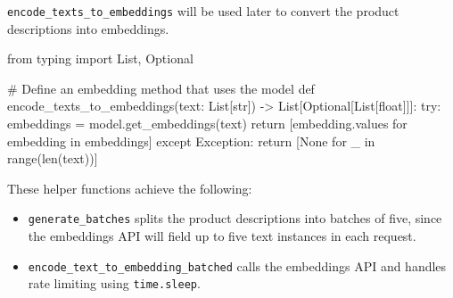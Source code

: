 \documentclass[
  letterpaper,
  DIV=11,
  numbers=noendperiod]{scrreprt}
\newenvironment{Shaded}{\begin{snugshade}}{\end{snugshade}}
\newcommand{\BuiltInTok}[1]{\textcolor[rgb]{0.00,0.23,0.31}{#1}}
\newcommand{\CommentTok}[1]{\textcolor[rgb]{0.37,0.37,0.37}{#1}}
\newcommand{\ControlFlowTok}[1]{\textcolor[rgb]{0.00,0.23,0.31}{#1}}
\newcommand{\ImportTok}[1]{\textcolor[rgb]{0.00,0.46,0.62}{#1}}
\newcommand{\KeywordTok}[1]{\textcolor[rgb]{0.00,0.23,0.31}{#1}}
\newcommand{\NormalTok}[1]{\textcolor[rgb]{0.00,0.23,0.31}{#1}}
\newcommand{\OperatorTok}[1]{\textcolor[rgb]{0.37,0.37,0.37}{#1}}
\newcommand{\PreprocessorTok}[1]{\textcolor[rgb]{0.68,0.00,0.00}{#1}}
\newcommand{\VariableTok}[1]{\textcolor[rgb]{0.07,0.07,0.07}{#1}}
\begin{document}
\texttt{encode\_texts\_to\_embeddings} will be used later to convert the
product descriptions into embeddings.

\begin{Shaded}
\begin{Highlighting}[]
\ImportTok{from}\NormalTok{ typing }\ImportTok{import}\NormalTok{ List, Optional}

\CommentTok{\# Define an embedding method that uses the model}
\KeywordTok{def}\NormalTok{ encode\_texts\_to\_embeddings(text: List[}\BuiltInTok{str}\NormalTok{]) }\OperatorTok{{-}\textgreater{}}\NormalTok{ List[Optional[List[}\BuiltInTok{float}\NormalTok{]]]:}
    \ControlFlowTok{try}\NormalTok{:}
\NormalTok{        embeddings }\OperatorTok{=}\NormalTok{ model.get\_embeddings(text)}
        \ControlFlowTok{return}\NormalTok{ [embedding.values }\ControlFlowTok{for}\NormalTok{ embedding }\KeywordTok{in}\NormalTok{ embeddings]}
    \ControlFlowTok{except} \PreprocessorTok{Exception}\NormalTok{:}
        \ControlFlowTok{return}\NormalTok{ [}\VariableTok{None} \ControlFlowTok{for}\NormalTok{ \_ }\KeywordTok{in} \BuiltInTok{range}\NormalTok{(}\BuiltInTok{len}\NormalTok{(text))]}
\end{Highlighting}
\end{Shaded}

These helper functions achieve the following:

\begin{itemize}
\item
  \texttt{generate\_batches} splits the product descriptions into
  batches of five, since the embeddings API will field up to five text
  instances in each request.
\item
  \texttt{encode\_text\_to\_embedding\_batched} calls the embeddings API
  and handles rate limiting using \texttt{time.sleep}.
\end{itemize}
\end{document}
